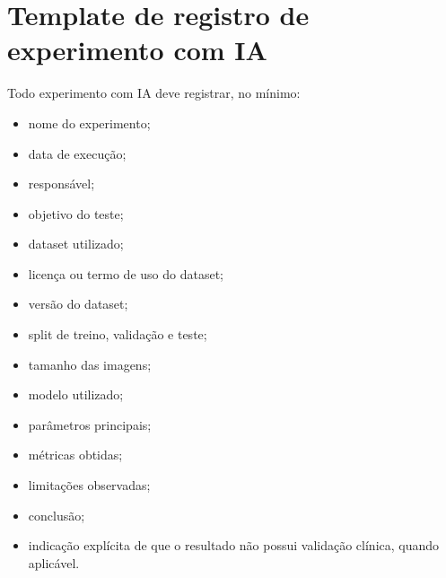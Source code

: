 \documentclass[
    12pt,
    oneside,
    a4paper,
    chapter=TITLE,
    brazil,
    sumario=tradicional,
    hidelinks
]{abntex2}
\begin{document}
\chapter{Template de registro de experimento com IA}

Todo experimento com IA deve registrar, no mínimo:

\begin{itemize}
    \item nome do experimento;
    \item data de execução;
    \item responsável;
    \item objetivo do teste;
    \item dataset utilizado;
    \item licença ou termo de uso do dataset;
    \item versão do dataset;
    \item split de treino, validação e teste;
    \item tamanho das imagens;
    \item modelo utilizado;
    \item parâmetros principais;
    \item métricas obtidas;
    \item limitações observadas;
    \item conclusão;
    \item indicação explícita de que o resultado não possui validação clínica, quando aplicável.
\end{itemize}
\end{document}
